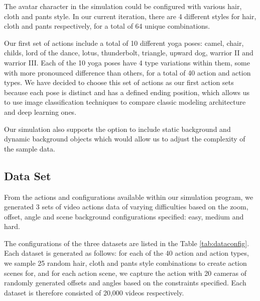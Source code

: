 \documentclass[
	a4paper, %
	10pt, %
	unnumberedsections, %
	twoside, %
]{t0004}
\begin{document}
The avatar character in the simulation could be configured with various hair, cloth and pants style. In our current iteration, there are 4 different styles for hair, cloth and pants respectively, for a total of 64 unique combinations.

Our first set of actions include a total of 10 different yoga poses: camel, chair, childs, lord of the dance, lotus, thunderbolt, triangle, upward dog, warrior II and warrior III. Each of the 10 yoga poses have 4 type variations within them, some with more pronounced difference than others,  for a total of 40 action and action types. We have decided to choose this set of actions as our first action sets because each pose is distinct and has a defined ending position, which allows us to use image classification techniques to compare classic modeling architecture and deep learning ones.

Our simulation also supports the option to include static background and dynamic background objects which would allow us to adjust the complexity of the sample data.

\subsection{Data Set} From the actions and configurations available within our simulation program, we generated 3 sets of video actions data of varying difficulties based on the zoom, offset, angle and scene background configurations specified: easy, medium and hard.

The configurations of the three datasets are listed in the Table \ref{tab:dataconfig}. Each dataset is generated as follows: for each of the 40 action and action types, we sample 25 random hair, cloth and pants style combinations to create action scenes for, and for each action scene, we capture the action with 20 cameras of randomly generated offsets and angles based on the constraints specified. Each dataset is therefore consisted of 20,000 videos respectively.
\end{document}
